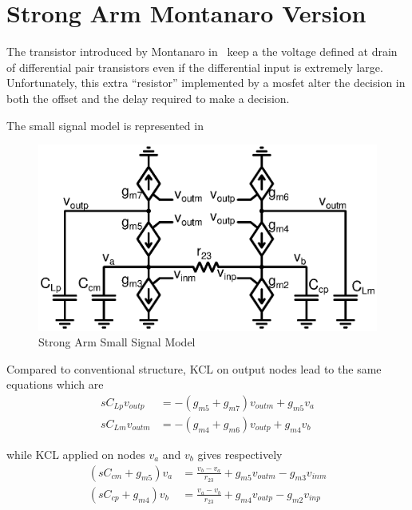 \section{Strong Arm Montanaro Version}
The transistor introduced by Montanaro in~\cite{Montanaro1996} keep a the voltage defined at drain of differential pair transistors even if the differential input is extremely large.
Unfortunately, this extra ``resistor'' implemented by a mosfet alter the decision in both the offset and the delay required to make a decision.

The small signal model is represented in 

\begin{figure}[htp]
    \centering
    \includegraphics[width=\textwidth]{Chapter7/Figs/sa_montanaro_small_signal_model.ps}
    \caption{Strong Arm Small Signal Model}
    \label{fig:annexe_sa_montanaro_small_signal}
\end{figure}

Compared to conventional structure, KCL on output nodes lead to the same equations which are
\begin{align}
    sC_{Lp} v_{outp} &= -(g_{m5}+g_{m7})v_{outm} + g_{m5}v_{a} \\
    sC_{Lm} v_{outm} &= -(g_{m4}+g_{m6})v_{outp} + g_{m4}v_{b}
\end{align}

while KCL applied on nodes \(v_a\) and \(v_b\) gives respectively
\begin{align}
    \label{eqn:annexe_va_vb_montanaro}
    \left(sC_{cm}+g_{m5}\right)v_a &= \frac{v_{b}-v_{a}}{r_{23}} + g_{m5}v_{outm} - g_{m3}v_{inm} \\
    \left(sC_{cp}+g_{m4}\right)v_b &= \frac{v_{a}-v_{b}}{r_{23}} + g_{m4}v_{outp} - g_{m2}v_{inp}
\end{align}

